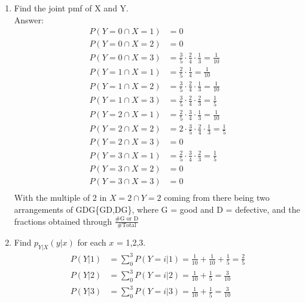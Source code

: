 \documentclass{article}
\begin{document}
\begin{enumerate}
        \begin{enumerate}
            \item   Find the joint pmf of X and Y.
                \\Answer:
                \begin{align*}
                    P(Y=0 \cap X=1) &= 0 \\
                    P(Y=0 \cap X=2) &= 0 \\
                    P(Y=0 \cap X=3) &= \frac{3}{5}\cdot\frac{2}{4}\cdot\frac{1}{3} = \frac{1}{10} \\
                    P(Y=1 \cap X=1) &= \frac{2}{5}\cdot\frac{1}{4} = \frac{1}{10} \\
                    P(Y=1 \cap X=2) &= \frac{3}{5}\cdot\frac{2}{4}\cdot\frac{1}{3} = \frac{1}{10} \\
                    P(Y=1 \cap X=3) &= \frac{3}{5}\cdot\frac{2}{4}\cdot\frac{2}{3} = \frac{1}{5} \\
                    P(Y=2 \cap X=1) &= \frac{2}{5}\cdot\frac{3}{4}\cdot\frac{1}{3} = \frac{1}{10} \\
                    P(Y=2 \cap X=2) &= 2\cdot\frac{3}{5}\cdot\frac{2}{4}\cdot\frac{1}{3} = \frac{1}{5}\\
                    P(Y=2 \cap X=3) &= 0 \\
                    P(Y=3 \cap X=1) &= \frac{2}{5}\cdot\frac{3}{4}\cdot\frac{2}{3} = \frac{1}{5} \\
                    P(Y=3 \cap X=2) &= 0 \\
                    P(Y=3 \cap X=3) &= 0 \\
                \end{align*}
                With the multiple of 2 in $X=2\cap Y=2$ coming from there being two arrangements of GDG\{GD,DG\}, where 
                G = good and D = defective, and the fractions obtained through $\frac{\text{\# G or D}}{\text{\# Total}}$
            \clearpage
            \item   Find $p_{Y|X}(y|x)$ for each $x$ = 1,2,3.
                \begin{align*}
                    P(Y|1) &= \sum^{3}_{0} P(Y=i|1) = \frac{1}{10}+\frac{1}{10}+\frac{1}{5} = \frac{2}{5} \\
                    P(Y|2) &= \sum^{3}_{0} P(Y=i|2) = \frac{1}{10}+\frac{1}{5} = \frac{3}{10} \\
                    P(Y|3) &= \sum^{3}_{0} P(Y=i|3) = \frac{1}{10}+\frac{1}{5} = \frac{3}{10} \\

\end{align*}
\end{enumerate}
\end{enumerate}
\end{document}
